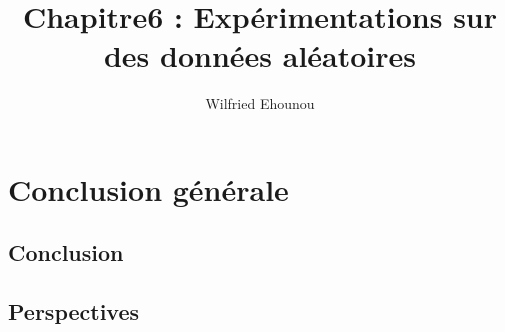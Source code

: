 \documentclass[onecolumn, 12pt]{book}
\title{Chapitre6 : Exp\'erimentations sur des donn\'ees al\'eatoires}
\author{Wilfried Ehounou}
\date{\oldstylenums{\today}}
\begin{document}
\chapter{Conclusion g\'en\'erale}
\section{Conclusion}
	
\section{Perspectives}
 	
 
 
\end{document}
